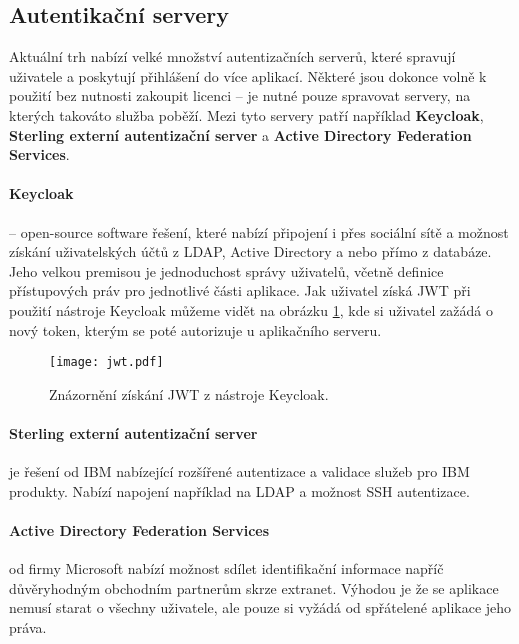 \subsection{Autentikační servery} \label{auth-server}
\par Aktuální trh nabízí velké množství autentizačních serverů, které spravují uživatele a poskytují přihlášení do více aplikací. Některé jsou dokonce volně k použití bez nutnosti zakoupit licenci -- je nutné pouze spravovat servery, na kterých takováto služba poběží. Mezi tyto servery patří například \textbf{Keycloak}, \textbf{Sterling externí autentizační server} a \textbf{Active Directory Federation Services}.

\paragraph{Keycloak} -- open-source software řešení, které nabízí připojení i přes sociální sítě a možnost získání uživatelských účtů z LDAP, Active Directory a nebo přímo z databáze. Jeho velkou premisou je jednoduchost správy uživatelů, včetně definice přístupových práv pro jednotlivé části aplikace. \cite{keycloak} Jak uživatel získá JWT při použití nástroje Keycloak můžeme vidět na obrázku \ref{keycloak-jwt-fig}, kde si uživatel zažádá o nový token, kterým se poté autorizuje u aplikačního serveru.

\begin{figure}[htp]
\centering
\texttt{[image: jwt.pdf]}
\caption{Znázornění získání JWT z nástroje Keycloak.}
\label{keycloak-jwt-fig}
\end{figure}

\paragraph{Sterling externí autentizační server} je řešení od IBM nabízející rozšířené autentizace a validace služeb pro IBM produkty. Nabízí napojení například na LDAP a možnost SSH autentizace. \cite{ibm-ster}

\paragraph{Active Directory Federation Services} od firmy Microsoft nabízí možnost sdílet identifikační informace napříč důvěryhodným obchodním partnerům skrze extranet. Výhodou je že se aplikace nemusí starat o všechny uživatele, ale pouze si vyžádá od spřátelené aplikace jeho práva. \cite{ADFS}

